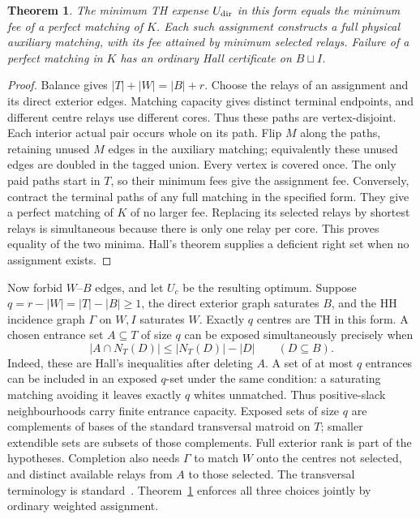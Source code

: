 \documentclass[11pt]{article}
\newtheorem{theorem}{Theorem}
\begin{document}
\begin{theorem}\label{thm:ports}
The minimum TH expense $U_{\rm dir}$ in this form equals the minimum
fee of a perfect matching of $K$. Each such assignment constructs a
full physical auxiliary matching, with its fee attained by minimum
selected relays. Failure of a perfect matching in $K$ has an ordinary
Hall certificate on $B\sqcup I$.
\end{theorem}
\begin{proof}
Balance gives $|T|+|W|=|B|+r$. Choose the relays of an assignment and
its direct exterior edges. Matching capacity gives distinct terminal
endpoints, and different centre relays use different cores. Thus these
paths are vertex-disjoint. Each interior actual pair occurs whole on
its path. Flip $M$ along the paths, retaining unused $M$ edges in the
auxiliary matching; equivalently these unused edges are doubled in the
tagged union. Every vertex is covered once. The only paid paths start
in $T$, so their minimum fees give the assignment fee. Conversely,
contract the terminal paths of any full matching in the specified form.
They give a perfect matching of $K$ of no larger fee. Replacing its
selected relays by shortest relays is simultaneous because there is
only one relay per core. This proves equality of the two minima.
Hall's theorem supplies a deficient right set when no assignment exists.
\end{proof}

Now forbid $W$--$B$ edges, and let $U_c$ be the resulting optimum.
Suppose $q=r-|W|=|T|-|B|\ge1$, the direct exterior graph saturates $B$,
and the HH incidence graph $\Gamma$ on $W,I$ saturates $W$. Exactly
$q$ centres are TH in this form. A chosen entrance set $A\subseteq T$
of size $q$ can be exposed simultaneously precisely when
\begin{equation}\label{eq:portcap}
 |A\cap N_T(D)|\le |N_T(D)|-|D|\qquad(D\subseteq B).
\end{equation}
Indeed, these are Hall's inequalities after deleting $A$. A set of at
most $q$ entrances can be included in an exposed $q$-set under the same
condition: a saturating matching avoiding it leaves exactly $q$ whites
unmatched. Thus positive-slack neighbourhoods carry finite entrance
capacity. Exposed sets of size $q$ are complements of bases of the
standard transversal matroid on $T$; smaller extendible sets are subsets
of those complements. Full exterior rank is part of the hypotheses.
Completion also needs $\Gamma$ to match $W$
onto the centres not selected, and distinct available relays from $A$
to those selected. The transversal terminology is standard~\cite{EF65}.
Theorem~\ref{thm:ports} enforces all three choices
jointly by ordinary weighted assignment.
\end{document}
